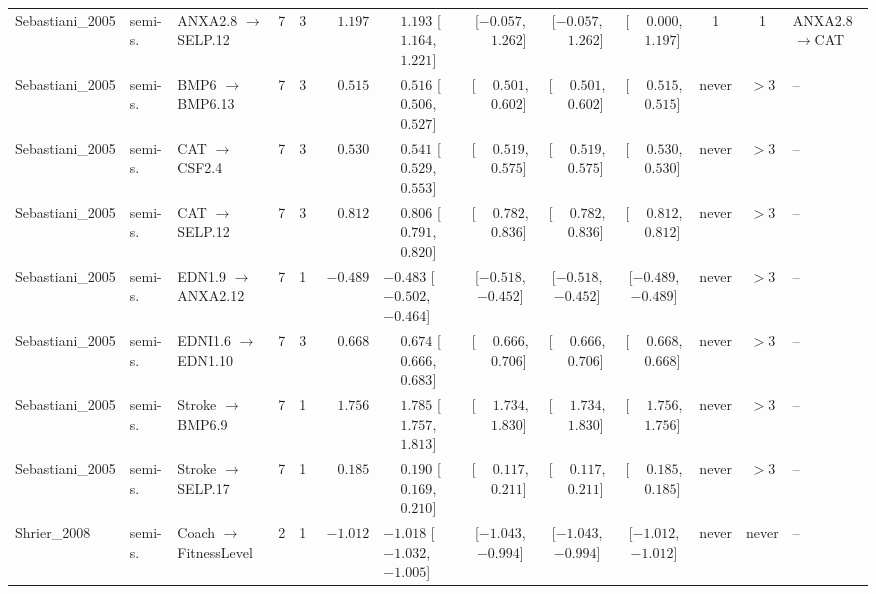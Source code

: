 \begin{landscape}
\begin{longtable}{@{}llp{2.15cm}ccrl cccc c l@{}}
Sebastiani\_2005 & semi-s. & ANXA2.8 $\to$ SELP.12 & 7 & 3 & $\phantom{-}1.197$ & $\phantom{-}1.193$ [$\phantom{-}1.164$, $\phantom{-}1.221$] & [$-0.057$, $\phantom{-}1.262$] & [$-0.057$, $\phantom{-}1.262$] & [$\phantom{-}0.000$, $\phantom{-}1.197$] & 1 & 1 & ANXA2.8$\to$CAT \\
Sebastiani\_2005 & semi-s. & BMP6 $\to$ BMP6.13 & 7 & 3 & $\phantom{-}0.515$ & $\phantom{-}0.516$ [$\phantom{-}0.506$, $\phantom{-}0.527$] & [$\phantom{-}0.501$, $\phantom{-}0.602$] & [$\phantom{-}0.501$, $\phantom{-}0.602$] & [$\phantom{-}0.515$, $\phantom{-}0.515$] & never & $>$3 & -- \\
Sebastiani\_2005 & semi-s. & CAT $\to$ CSF2.4 & 7 & 3 & $\phantom{-}0.530$ & $\phantom{-}0.541$ [$\phantom{-}0.529$, $\phantom{-}0.553$] & [$\phantom{-}0.519$, $\phantom{-}0.575$] & [$\phantom{-}0.519$, $\phantom{-}0.575$] & [$\phantom{-}0.530$, $\phantom{-}0.530$] & never & $>$3 & -- \\
Sebastiani\_2005 & semi-s. & CAT $\to$ SELP.12 & 7 & 3 & $\phantom{-}0.812$ & $\phantom{-}0.806$ [$\phantom{-}0.791$, $\phantom{-}0.820$] & [$\phantom{-}0.782$, $\phantom{-}0.836$] & [$\phantom{-}0.782$, $\phantom{-}0.836$] & [$\phantom{-}0.812$, $\phantom{-}0.812$] & never & $>$3 & -- \\
Sebastiani\_2005 & semi-s. & EDN1.9 $\to$ ANXA2.12 & 7 & 1 & $-0.489$ & $-0.483$ [$-0.502$, $-0.464$] & [$-0.518$, $-0.452$] & [$-0.518$, $-0.452$] & [$-0.489$, $-0.489$] & never & $>$3 & -- \\
Sebastiani\_2005 & semi-s. & EDNI1.6 $\to$ EDN1.10 & 7 & 3 & $\phantom{-}0.668$ & $\phantom{-}0.674$ [$\phantom{-}0.666$, $\phantom{-}0.683$] & [$\phantom{-}0.666$, $\phantom{-}0.706$] & [$\phantom{-}0.666$, $\phantom{-}0.706$] & [$\phantom{-}0.668$, $\phantom{-}0.668$] & never & $>$3 & -- \\
Sebastiani\_2005 & semi-s. & Stroke $\to$ BMP6.9 & 7 & 1 & $\phantom{-}1.756$ & $\phantom{-}1.785$ [$\phantom{-}1.757$, $\phantom{-}1.813$] & [$\phantom{-}1.734$, $\phantom{-}1.830$] & [$\phantom{-}1.734$, $\phantom{-}1.830$] & [$\phantom{-}1.756$, $\phantom{-}1.756$] & never & $>$3 & -- \\
Sebastiani\_2005 & semi-s. & Stroke $\to$ SELP.17 & 7 & 1 & $\phantom{-}0.185$ & $\phantom{-}0.190$ [$\phantom{-}0.169$, $\phantom{-}0.210$] & [$\phantom{-}0.117$, $\phantom{-}0.211$] & [$\phantom{-}0.117$, $\phantom{-}0.211$] & [$\phantom{-}0.185$, $\phantom{-}0.185$] & never & $>$3 & -- \\
Shrier\_2008 & semi-s. & Coach $\to$ Fitness\allowbreak{}Level & 2 & 1 & $-1.012$ & $-1.018$ [$-1.032$, $-1.005$] & [$-1.043$, $-0.994$] & [$-1.043$, $-0.994$] & [$-1.012$, $-1.012$] & never & never & -- \\

\end{longtable}
\end{landscape}
